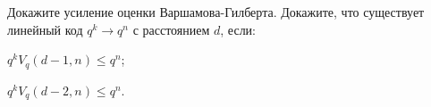 Докажите усиление оценки Варшамова-Гилберта. Докажите, что существует линейный код $q^k \to q^n$ с расстоянием $d$, если:
\begin{enumcyr}
    \item $q^k V_q(d - 1, n) \le q^n$;
    \item $q^k V_q(d - 2, n) \le q^n$.
\end{enumcyr}